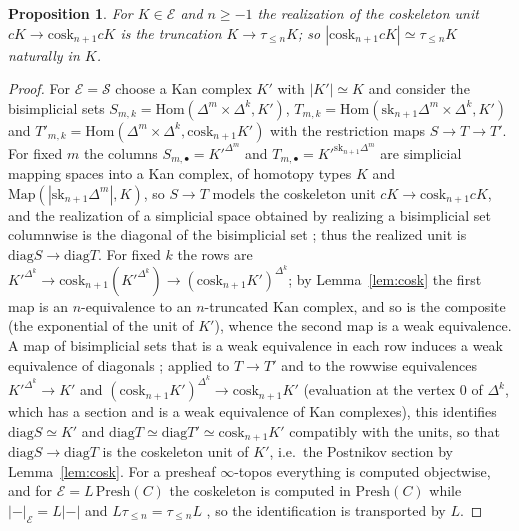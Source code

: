 \documentclass[11pt]{amsart}
\newtheorem{prop}[thm]{Proposition}
\theoremstyle{definition}
\newcommand{\Presh}{\mathrm{Presh}}
\newcommand{\Hom}{\mathrm{Hom}}
\newcommand{\Map}{\mathrm{Map}}
\newcommand{\cosk}{\mathrm{cosk}}
\newcommand{\sk}{\mathrm{sk}}
\newcommand{\sS}{\mathcal S}
\newcommand{\E}{\mathcal E}
\newcommand{\tr}[1]{\tau_{\le #1}}
\newcommand{\diag}{\mathrm{diag}}
\begin{document}
\begin{prop}\label{prop:const}
For $K\in\E$ and $n\ge-1$ the realization of the coskeleton unit
$cK\to\cosk_{n+1}cK$ is the truncation $K\to\tr nK$; so
$|\cosk_{n+1}cK|\simeq\tr nK$ naturally in $K$.
\end{prop}
\begin{proof}
For $\E=\sS$ choose a Kan complex $K'$ with $|K'|\simeq K$ and consider the
bisimplicial sets $S_{m,k}=\Hom(\Delta^m\times\Delta^k,K')$,
$T_{m,k}=\Hom(\sk_{n+1}\Delta^m\times\Delta^k,K')$ and
$T'_{m,k}=\Hom(\Delta^m\times\Delta^k,\cosk_{n+1}K')$ with the restriction maps
$S\to T\to T'$. For fixed $m$ the columns $S_{m,\bullet}=K'^{\Delta^m}$ and
$T_{m,\bullet}=K'^{\sk_{n+1}\Delta^m}$ are simplicial mapping spaces into a Kan
complex, of homotopy types $K$ and $\Map(|\sk_{n+1}\Delta^m|,K)$, so $S\to T$
models the coskeleton unit $cK\to\cosk_{n+1}cK$, and the realization of a
simplicial space obtained by realizing a bisimplicial set columnwise is the
diagonal of the bisimplicial set \cite[IV.1.9 and Ex.~IV.1.7]{GJ}; thus the
realized unit is $\diag S\to\diag T$. For fixed
$k$ the rows are $K'^{\Delta^k}\to\cosk_{n+1}(K'^{\Delta^k})\to(\cosk_{n+1}K')^{\Delta^k}$;
by Lemma~\ref{lem:cosk} the first map is an $n$-equivalence to an
$n$-truncated Kan complex, and so is the composite (the exponential of the unit
of $K'$), whence the second map is a weak equivalence. A map of bisimplicial sets that is a weak equivalence in each row induces a
weak equivalence of diagonals \cite[IV.1.7]{GJ}; applied to $T\to T'$ and to
the rowwise equivalences $K'^{\Delta^k}\to K'$ and
$(\cosk_{n+1}K')^{\Delta^k}\to\cosk_{n+1}K'$ (evaluation at the vertex $0$ of
$\Delta^k$, which has a section and is a weak equivalence of Kan complexes),
this identifies $\diag S\simeq K'$ and $\diag T\simeq\diag T'\simeq\cosk_{n+1}K'$
compatibly with the units, so that $\diag S\to\diag T$ is the coskeleton unit
of $K'$, i.e.\ the Postnikov section by Lemma~\ref{lem:cosk}.
For a presheaf $\infty$-topos everything is computed objectwise, and for
$\E=L\,\Presh(C)$ the coskeleton is computed in $\Presh(C)$ while
$|{-}|_\E=L|{-}|$ and $L\tr n=\tr nL$ \cite[5.5.6.28]{HTT}, so the identification
is transported by $L$.
\end{proof}
\end{document}
